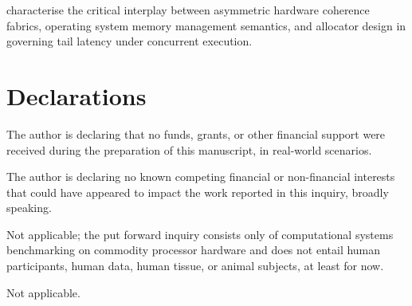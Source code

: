 \documentclass[pdflatex,sn-mathphys-num]{sn-jnl}
\begin{document}
{characterise the critical interplay between asymmetric hardware coherence fabrics, operating system memory management semantics, and allocator design in governing tail latency under concurrent execution.
}


\maketitle

\renewcommand{\topfraction}{0.90}
\renewcommand{\bottomfraction}{0.85}
\renewcommand{\textfraction}{0.08}
\renewcommand{\floatpagefraction}{0.75}
\setcounter{topnumber}{4}
\setcounter{bottomnumber}{4}
\setcounter{totalnumber}{8}










\backmatter

\clearpage

\section*{Declarations}


The author is declaring that no funds, grants, or other financial support were received during the preparation of this manuscript, in real-world scenarios.


The author is declaring no known competing financial or non-financial interests that could have appeared to impact the work reported in this inquiry, broadly speaking.


Not applicable; the put forward inquiry consists only of computational systems benchmarking on commodity processor hardware and does not entail human participants, human data, human tissue, or animal subjects, at least for now.


Not applicable.

\end{document}

